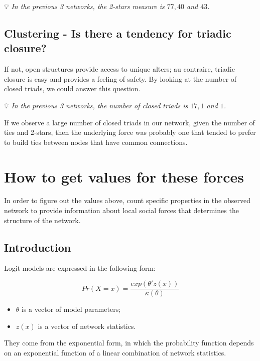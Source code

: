 \documentclass[
  notitlepage,
  onecolumn,
  openany]{book}
\providecommand{\tightlist}{%
  \setlength{\itemsep}{0pt}\setlength{\parskip}{0pt}}
\begin{document}
💡 \emph{In the previous 3 networks, the 2-stars measure is \(77, 40\) and \(43\).}

\hypertarget{clustering---is-there-a-tendency-for-triadic-closure}{%
\subsection{Clustering - Is there a tendency for triadic closure?}\label{clustering---is-there-a-tendency-for-triadic-closure}}

If not, open structures provide access to unique alters; au contraire, triadic closure is easy and provides a feeling of safety. By looking at the number of closed triads, we could answer this question.

💡 \emph{In the previous 3 networks, the number of closed triads is \(17, 1\) and \(1\).}

If we observe a large number of closed triads in our network, given the number of ties and 2-stars, then the underlying force was probably one that tended to prefer to build ties between nodes that have common connections.

\hypertarget{how-to-get-values-for-these-forces}{%
\section{How to get values for these forces}\label{how-to-get-values-for-these-forces}}

In order to figure out the values above, count specific properties in the observed network to provide information about local social forces that determines the structure of the network.

\hypertarget{introduction-2}{%
\subsection{Introduction}\label{introduction-2}}

Logit models are expressed in the following form:

\[
Pr(X=x) = \frac{exp(\theta'z(x))}{\kappa(\theta)}
\]

\begin{itemize}
\tightlist
\item
  \(\theta\) is a vector of model parameters;
\item
  \(z(x)\) is a vector of network statistics.
\end{itemize}

They come from the exponential form, in which the probability function depends on an exponential function of a linear combination of network statistics.
\end{document}

